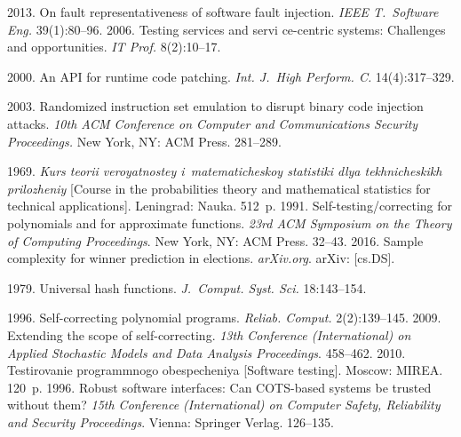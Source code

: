 \begin{multicols}{2}
{{\begin{thebibliography}{99}
\columnbreak

 2013. On fault 
representativeness of software fault injection. \textit{IEEE T.~Software Eng.} 
39(1):80--96.
 2006. Testing services and servi ce-centric 
systems: Challenges and opportunities. \textit{IT Prof.} 8(2):10--17.

 2000.  An API for runtime code patching.   
\textit{Int. J.~High Perform. C.} 14(4):317--329.

 2003. Randomized instruction set emulation to disrupt binary code 
injection attacks. \textit{10th ACM Conference on Computer and Communications 
Security Proceedings.} New York, NY: ACM Press. 281--289.

 1969. \textit{Kurs teorii 
veroyatnostey i~matematicheskoy statistiki dlya tekhnicheskikh prilozheniy} 
[Course in the probabilities theory and mathematical statistics for technical 
applications]. Leningrad: Nauka. 512~p.
1991. Self-testing/correcting for polynomials and for approximate functions. 
\textit{23rd ACM Symposium on the Theory of Computing Proceedings}. New 
York, NY: ACM Press. 32--43.
 2016. Sample complexity for winner 
prediction in elections. \mbox{\textit{arXiv.org}}.  arXiv: [cs.DS].


 1979. Universal hash functions. 
\textit{J.~Comput. Syst. Sci.} 18:143--154.

 1996. Self-correcting polynomial programs. 
\textit{Reliab. Comput.} 2(2):139--145.
 2009. Extending the scope of self-correcting. 
\textit{13th Conference (International) on Applied Stochastic Models and Data 
Analysis Proceedings}. 458--462.
 2010. Testirovanie programmnogo 
obespecheniya [Software testing].  Moscow: MIREA. 120~p.
 1996.  Robust software interfaces: Can 
COTS-based systems be trusted without them? \textit{15th Conference 
(International) on Computer Safety, Reliability and Security Proceedings}. Vienna: 
Springer Verlag. 126--135.
  
\end{thebibliography}

 }
 }

\end{multicols}

